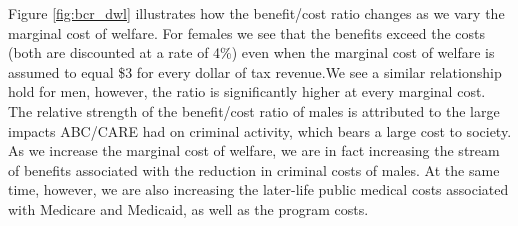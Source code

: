 \noindent Figure \ref{fig:bcr_dwl} illustrates how the benefit/cost ratio changes as we vary
the marginal cost of welfare. For females we see that the benefits exceed the costs (both are discounted at a rate of 4\%) even when the marginal cost of welfare is
assumed to equal \$3 for every dollar of tax revenue.We see a similar relationship hold for men, however, the ratio is significantly higher at every marginal cost.  
The relative strength of the benefit/cost ratio of males is attributed to the 
large impacts ABC/CARE had on criminal activity, which bears a large cost to society. As we
increase the marginal cost of welfare, we are in fact increasing the stream of benefits
associated with the reduction in criminal costs of males. At the same time, however,
we are also increasing the later-life public medical costs associated with Medicare
and Medicaid, as well as the program costs. 

